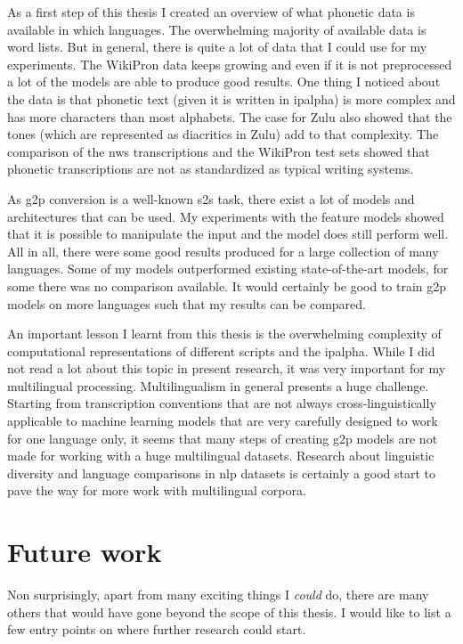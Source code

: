 \label{chap:6_conclusion}
As a first step of this thesis I created an overview of what phonetic data is available in which languages. The overwhelming majority of available data is word lists. But in general, there is quite a lot of data that I could use for my experiments. The WikiPron data keeps growing and even if it is not preprocessed a lot of the models are able to produce good results. One thing I noticed about the data is that phonetic text (given it is written in \ac{ipalpha}) is more complex and has more characters than most alphabets. The case for Zulu also showed that the tones (which are represented as diacritics in Zulu) add to that complexity. The comparison of the \ac{nws} transcriptions and the WikiPron test sets showed that phonetic transcriptions are not as standardized as typical writing systems. 

As \ac{g2p} conversion is a well-known \ac{s2s} task, there exist a lot of models and architectures that can be used. My experiments with the feature models showed that it is possible to manipulate the input and the model does still perform well. All in all, there were some good results produced for a large collection of many languages. Some of my models outperformed existing state-of-the-art models, for some there was no comparison available. It would certainly be good to train \ac{g2p} models on more languages such that my results can be compared. 

An important lesson I learnt from this thesis is the overwhelming complexity of computational representations of different scripts and the \ac{ipalpha}. While I did not read a lot about this topic in present research, it was very important for my multilingual processing. Multilingualism in general presents a huge challenge. Starting from transcription conventions that are not always cross-linguistically applicable to machine learning models that are very carefully designed to work for one language only, it seems that many steps of creating \ac{g2p} models are not made for working with a huge multilingual datasets. Research about linguistic diversity and language comparisons in \ac{nlp} datasets is certainly a good start to pave the way for more work with multilingual corpora.

\section*{Future work}
Non surprisingly, apart from many exciting things I \textit{could} do, there are many others that would have gone beyond the scope of this thesis. I would like to list a few entry points on where further research could start. 

